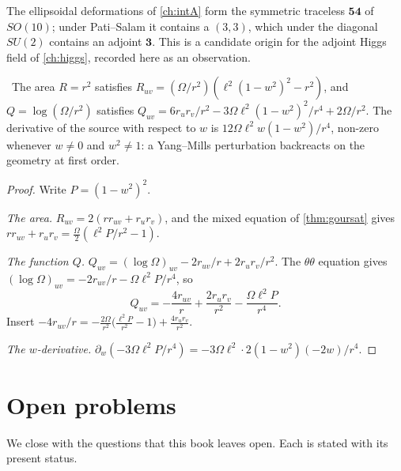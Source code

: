 The ellipsoidal deformations of \cref{ch:intA} form the symmetric traceless $\mathbf{54}$ of $SO(10)$; under Pati--Salam it contains a $(3,3)$, which under the diagonal $SU(2)$ contains an adjoint $\mathbf3$. This is a candidate origin for the adjoint Higgs field of \cref{ch:higgs}, recorded here as an observation.

\begin{proposition}\label{prop:areaQ}\ver\
The area $R=r^2$ satisfies $R_{uv}=(\Omega/r^2)(\ell^2(1-w^2)^2-r^2)$, and $Q=\log(\Omega/r^2)$ satisfies $Q_{uv}=6r_ur_v/r^2-3\Omega\ell^2(1-w^2)^2/r^4+2\Omega/r^2$. The derivative of the source with respect to $w$ is $12\Omega\ell^2w(1-w^2)/r^4$, non-zero whenever $w\ne0$ and $w^2\ne1$: a Yang--Mills perturbation backreacts on the geometry at first order.
\end{proposition}
\begin{proof}
Write $P=(1-w^2)^2$.

\emph{The area.} $R_{uv}=2(rr_{uv}+r_ur_v)$, and the mixed equation of \cref{thm:goursat} gives $rr_{uv}+r_ur_v=\frac\Omega2(\ell^2P/r^2-1)$.

\emph{The function $Q$.} $Q_{uv}=(\log\Omega)_{uv}-2r_{uv}/r+2r_ur_v/r^2$. The $\theta\theta$ equation gives $(\log\Omega)_{uv}=-2r_{uv}/r-\Omega\ell^2P/r^4$, so
\[
Q_{uv}=-\frac{4r_{uv}}r+\frac{2r_ur_v}{r^2}-\frac{\Omega\ell^2P}{r^4}.
\]
Insert $-4r_{uv}/r=-\frac{2\Omega}{r^2}\bigl(\frac{\ell^2P}{r^2}-1\bigr)+\frac{4r_ur_v}{r^2}$.

\emph{The $w$-derivative.} $\partial_w(-3\Omega\ell^2P/r^4)=-3\Omega\ell^2\cdot2(1-w^2)(-2w)/r^4$.
\end{proof}


\section{Open problems}

We close with the questions that this book leaves open. Each is stated with its present status.

